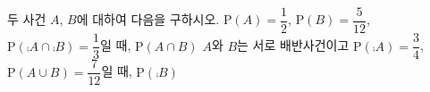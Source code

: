 두 사건 $A$, $B$에 대하여 다음을 구하시오.
 $\mathrm{P}(A)=\dfrac{1}{2}$, $\mathrm{P}(B)=\dfrac{5}{12}$, $\mathrm{P}(\comp{A}\cap\comp{B})=\dfrac{1}{3}$일 때, $\mathrm{P}(A\cap B)$
 $A$와 $B$는 서로 배반사건이고 $\mathrm{P}(\comp{A})=\dfrac{3}{4}$, $\mathrm{P}(A\cup B)=\dfrac{7}{12}$일 때, $\mathrm{P}(\comp{B})$
